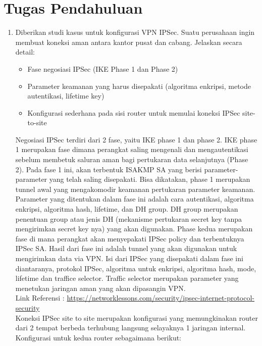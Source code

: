 \section{Tugas Pendahuluan}
\begin{enumerate}
	\item Diberikan studi kasus untuk konfigurasi VPN IPSec. Suatu perusahaan ingin membuat koneksi aman antara kantor pusat dan cabang. Jelaskan secara detail:
	\begin{itemize}
		\item Fase negosiasi IPSec (IKE Phase 1 dan Phase 2)
		\item Parameter keamanan yang harus disepakati (algoritma enkripsi, metode autentikasi, lifetime key)
		\item Konfigurasi sederhana pada sisi router untuk memulai koneksi IPSec site-to-site
	\end{itemize}

	Negosiasi IPSec terdiri dari 2 fase, yaitu IKE phase 1 dan phase 2. IKE phase 1 merupakan fase dimana perangkat saling mengenali dan mengautentikasi sebelum membetuk saluran aman bagi pertukaran data selanjutnya (Phase 2). Pada fase 1 ini, akan terbentuk ISAKMP SA yang berisi parameter-parameter yang telah saling disepakati. Bisa dikatakan, phase 1 merupakan tunnel awal yang mengakomodir keamanan pertukaran parameter keamanan. Parameter yang ditentukan dalam fase ini adalah cara autentikasi, algoritma enkripsi, algoritma hash, lifetime, dan DH group. DH group merupakan penentuan group atau jenis DH (mekanisme pertukaran secret key tanpa mengirimkan secret key nya) yang akan digunakan. Phase kedua merupakan fase di mana perangkat akan menyepakati IPSec policy dan terbentuknya IPSec SA. Hasil dari fase ini adalah tunnel yang akan digunakan untuk mengirimkan data via VPN. Isi dari IPSec yang disepakati dalam fase ini diantaranya, protokol IPSec, algoritma untuk enkripsi, algoritma hash, mode, lifetime dan traffice selector. Traffic selector merupakan parameter yang menetukan jaringan aman yang akan dipasangin VPN. \\

	Link Referensi : \url{https://networklessons.com/security/ipsec-internet-protocol-security}\\

	Koneksi IPSec site to site merupakan konfigurasi yang memungkinakan router dari 2 tempat berbeda terhubung langsung selayaknya 1 jaringan internal. Konfigurasi untuk kedua router sebagaimana berikut:\\


\end{enumerate}
